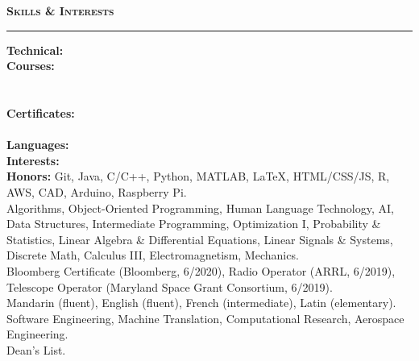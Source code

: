\documentclass[10pt, letterpaper]{article}
\begin{document}
{\large \textbf{\textsc{Skills \& Interests}}}
\vspace{5pt}
\hrule
{}
\begin{paracol}{2}
\textbf{Technical:}\\
\textbf{Courses:}\\~\\~\\
\textbf{Certificates:}\\~\\
\textbf{Languages:}\\
\textbf{Interests:}\\
\textbf{Honors:}
\switchcolumn
Git, Java, C/C++, Python, MATLAB, \LaTeX, HTML/CSS/JS, R, AWS, CAD, Arduino, Raspberry Pi.\\
Algorithms, Object-Oriented Programming, Human Language Technology, AI, Data Structures, Intermediate Programming, Optimization I, Probability \& Statistics, Linear Algebra \& Differential Equations, Linear Signals \& Systems, Discrete Math, Calculus III, Electromagnetism, Mechanics.\\
Bloomberg Certificate (Bloomberg, 6/2020), Radio Operator (ARRL, 6/2019), Telescope Operator (Maryland Space Grant Consortium, 6/2019).\\
Mandarin (fluent), English (fluent), French (intermediate), Latin (elementary).\\
Software Engineering, Machine Translation, Computational Research, Aerospace Engineering.\\
Dean's List.
\end{paracol}
\thispagestyle{empty}
\end{document}
